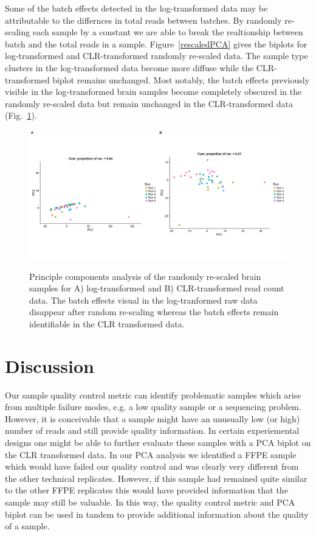 \documentclass{article}\usepackage[]{graphicx}\usepackage[]{color}
\theoremstyle{definition}
\begin{document}
Some of the batch effects detected in the log-transformed data may be attributable to the differnces in total reads between batches.  By randomly re-scaling each sample by a constant we are able to break the realtionship between batch and the total reads in a sample. Figure~\ref{rescaledPCA} gives the biplots for log-transformed and CLR-transformed randomly re-scaled data.  The sample type clusters in the log-transformed data become more diffuse while the CLR-transformed biplot remains unchanged.  Most notably, the batch effects previously visible in the log-transformed brain samples become completely obscured in the randomly re-scaled data but remain unchanged in the CLR-transformed data (Fig.~\ref{rescaledPCAbrain}).  

\begin{figure}
\includegraphics[scale=0.4]{./Figures/IO_PCA_Brain_logRaw_CLR_perturbed}
\label{rescaledPCAbrain}
\caption{Principle components analysis of the randomly re-scaled brain samples for A) log-transformed and B) CLR-transformed read count data.  The batch effects visual in the log-tranformed raw data disappear after random re-scaling whereas the batch effects remain identifiable in the CLR transformed data.}
\end{figure}

\FloatBarrier
\section{Discussion}

Our sample quality control metric can identify problematic samples which arise from multiple failure modes, e.g. a low quality sample or a sequencing problem.  However, it is conceivable that a sample might have an unusually low (or high) number of reads and still provide quality information.  In certain experiemental designs one might be able to further evaluate these samples with a PCA biplot on the CLR transformed data. In our PCA analysis we identified a FFPE sample which would have failed our quality control and was clearly very different from the other technical replicates.  However, if this sample had remained quite similar to the other FFPE replicates this would have provided information that the sample may still be valuable.  In this way, the quality control metric and PCA biplot can be used in tandem to provide additional information about the quality of a sample.\\
\end{document}

